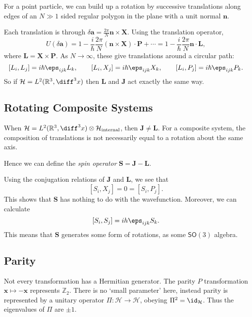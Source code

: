 \documentclass[12pt]{article}
\begin{document}
For a point particle, we can build up a rotation by successive translations along edges of an $N \gg 1$ sided regular polygon in the plane with a unit normal $\mathbf{n}$.

Each translation is through $\delta \mathbf{a} = \frac{2\pi}{N} \mathbf{n} \times \mathbf{X}$. Using the translation operator,
\[
U(\delta \mathbf{a}) = 1 - \frac{i}{\hbar} \frac{2\pi}{N} (\mathbf{n} \times \mathbf{X}) \cdot \mathbf{P} + \cdots = 1 - \frac{i}{\hbar} \frac{2\pi}{N} \mathbf{n} \cdot \mathbf{L},
\]
where $\mathbf{L} = \mathbf{X} \times \mathbf{P}$. As $N \to \infty$, these give translations around a circular path:
\[
	[L_i, L_j] = i \hbar \eps_{ijk} L_k, \qquad [L_i, X_j] = i\hbar \eps_{ijk} X_k, \qquad [L_i, P_j] = i\hbar \eps_{ijk} P_k.
\]
So if $\mathcal{H} = L^2(\mathbb{R}^3, \diff^3 x)$ then $\mathbf{L}$ and $\mathbf{J}$ act exactly the same way.

\subsection{Rotating Composite Systems}
\label{sub:rot_comp}

When $\mathcal{H}=L^2(\mathbb{R}^3, \diff^3 x) \otimes \mathcal{H}_{\mathrm{internal}}$, then $\mathbf{J} \neq \mathbf{L}$. For a composite system, the composition of translations is not necessarily equal to a rotation about the same axis.

Hence we can define the \emph{spin operator} $\mathbf{S} = \mathbf{J} - \mathbf{L}$.

Using the conjugation relations of $\mathbf{J}$ and $\mathbf{L}$, we see that
\[
	[S_i, X_j] = 0 = [S_i, P_j].
\]
This shows that $\mathbf{S}$ has nothing to do with the wavefunction. Moreover, we can calculate
\[
	[S_i, S_j] = ih \eps_{ijk} S_k.
\]
This means that $\mathbf{S}$ generates some form of rotations, as some $\mathsf{SO}(3)$ algebra.

\subsection{Parity}
\label{sub:parity}

Not every transformation has a Hermitian generator. The parity $P$ transformation $\mathbf{x} \mapsto -\mathbf{x}$ represents $\mathbb{Z}_2$. There is no `small parameter' here, instead parity is represented by a unitary operator $\Pi : \mathcal{H} \to \mathcal{H}$, obeying $\Pi^2 = \id_{\mathcal{H}}$. Thus the eigenvalues of $\Pi$ are $\pm1$.
\end{document}
